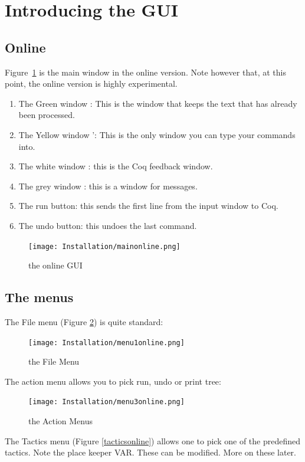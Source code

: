 \section{Introducing the GUI}
\subsection{Online}

Figure~\ref{online gui}  is the main window in the online version.
Note however that, at this point, the online version is highly experimental.
\begin{enumerate}
\item The Green window  : This is the window that keeps the text that has already been processed.
\item The Yellow window ': This is the only window you can type your commands into.
\item The white window : this is the Coq feedback window. 
\item The grey window : this is a window for messages.
\item The run button: this sends the first line from the input window to Coq.
\item The undo button: this undoes the last command.
\end{enumerate}
\begin{figure}[h!]
\texttt{[image: Installation/mainonline.png]}
\caption{the online GUI}\label{online gui}
\end{figure}

\subsection{The menus}

The File menu (Figure \ref{file}) is quite standard:

\begin{figure}[h!]
\texttt{[image: Installation/menu1online.png]}


\caption{the File  Menu}\label{file}
\end{figure}

The action menu allows you to pick run, undo or print tree:

\begin{figure}[h!]
\texttt{[image: Installation/menu3online.png]}


\caption{the Action Menus}\label{actionsonline}
\end{figure}


The Tactics menu (Figure \ref{tacticsonline}) allows one to pick one of the predefined tactics. 
Note the place keeper VAR. 
These can be modified. More on these later.

